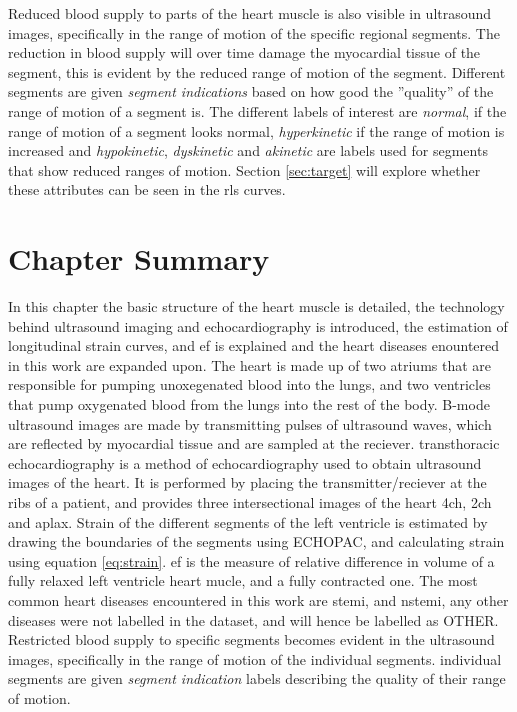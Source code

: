 Reduced blood supply to parts of the heart muscle is also visible in ultrasound images, specifically in the range of motion of the specific regional segments. The reduction in blood supply will over time damage the myocardial tissue of the segment, this is evident by the reduced range of motion of the segment. Different segments are given \textit{segment indications} based on how good the ''quality'' of the range of motion of a segment is. The different labels of interest are \textit{normal}, if the range of motion of a segment looks normal, \textit{hyperkinetic} if the range of motion is increased and \textit{hypokinetic}, \textit{dyskinetic} and \textit{akinetic} are labels used for segments that show reduced ranges of motion. Section \ref{sec:target} will explore whether these attributes can be seen in the \acrshort{rls} curves.

\section{Chapter Summary}

In this chapter the basic structure of the heart muscle is detailed, the technology behind ultrasound imaging and echocardiography is introduced, the estimation of longitudinal strain curves, and \acrshort{ef} is explained and the heart diseases enountered in this work are expanded upon. The heart is made up of two atriums that are responsible for pumping unoxegenated blood into the lungs, and two ventricles that pump oxygenated blood from the lungs into the rest of the body. B-mode ultrasound images are made by transmitting pulses of ultrasound waves, which are reflected by myocardial tissue and are sampled at the reciever. transthoracic echocardiography is a method of echocardiography used to obtain ultrasound images of the heart. It is performed by placing the transmitter/reciever at the ribs of a patient, and provides three intersectional images of the heart \acrshort{4ch}, \acrshort{2ch} and \acrshort{aplax}. Strain of the different segments of the left ventricle is estimated by drawing the boundaries of the segments using ECHOPAC, and calculating strain using equation \eqref{eq:strain}. \acrshort{ef} is the measure of relative difference in volume of a fully relaxed left ventricle heart mucle, and a fully contracted one. The most common heart diseases encountered in this work are \acrshort{stemi}, and \acrshort{nstemi}, any other diseases were not labelled in the dataset, and will hence be labelled as OTHER. Restricted blood supply to specific segments becomes evident in the ultrasound images, specifically in the range of motion of the individual segments. individual segments are given \textit{segment indication} labels describing the quality of their range of motion. 
